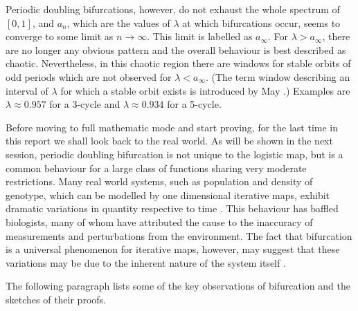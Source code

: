 Periodic doubling bifurcations, however, do not exhaust the whole spectrum of $[0,1]$, and $a_{n}$, which are the values of $\lambda$ at which bifurcations occur, seems to converge to some limit as $n \rightarrow \infty$. 
This limit is labelled as $a_{\infty}$.
For $\lambda > a_{\infty}$, there are no longer any obvious pattern and the overall behaviour is best described as chaotic. 
Nevertheless, in this chaotic region there are windows for stable orbits of odd periods which are not observed for $\lambda < a_{\infty}$. (The term window describing an interval of $\lambda$ for which a stable orbit exists is introduced by May \cite{May_Nature}.)
Examples are $\lambda \approx 0.957$ for a 3-cycle and $\lambda \approx 0.934$ for a 5-cycle.

Before moving to full mathematic mode and start proving, for the last time in this report we shall look back to the real world. 
As will be shown in the next session, periodic doubling bifurcation is not unique to the logistic map, but is a common behaviour for a large class of functions sharing very moderate restrictions. 
Many real world systems, such as population and density of genotype, which can be modelled by one dimensional iterative maps, exhibit dramatic variations in quantity respective to time \cite{colorado_potato_beetle}.
This behaviour has baffled biologists, many of whom have attributed the cause to the inaccuracy of measurements and perturbations from the environment. 
The fact that bifurcation is a universal phenomenon for iterative maps, however, may suggest that these variations may be due to the inherent nature of the system itself \cite{genotype}.


The following paragraph lists some of the key observations of bifurcation and the sketches of their proofs.

